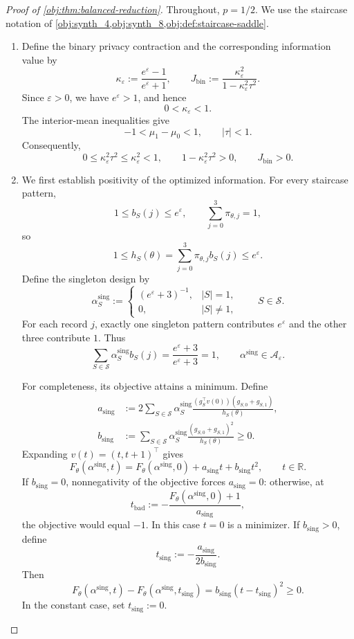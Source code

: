 \documentclass[11pt]{article}
\begin{document}
\begin{proof}[Proof of \cref{obj:thm:balanced-reduction}]
Throughout, \(p=1/2\). We use the staircase notation of \cref{obj:synth_4,obj:synth_8,obj:def:staircase-saddle}.

\begin{enumerate}
\item Define the binary privacy contraction and the corresponding information value by
\[
\kappa_\varepsilon
:=\frac{e^\varepsilon-1}{e^\varepsilon+1},
\qquad
J_{\mathrm{bin}}
:=\frac{\kappa_\varepsilon^2}
{1-\kappa_\varepsilon^2\tau^2}.
\]
Since \(\varepsilon>0\), we have \(e^\varepsilon>1\), and hence
\[
0<\kappa_\varepsilon<1.
\]
The interior-mean inequalities give
\[
-1<\mu_1-\mu_0<1,
\qquad |\tau|<1.
\]
Consequently,
\[
0\le \kappa_\varepsilon^2\tau^2
\le \kappa_\varepsilon^2<1,
\qquad
1-\kappa_\varepsilon^2\tau^2>0,
\qquad
J_{\mathrm{bin}}>0.
\]

\item We first establish positivity of the optimized information. For every staircase pattern,
\[
1\le b_S(j)\le e^\varepsilon,
\qquad
\sum_{j=0}^3\pi_{\theta,j}=1,
\]
so
\[
1\le h_S(\theta)
=\sum_{j=0}^3\pi_{\theta,j}b_S(j)
\le e^\varepsilon.
\]
Define the singleton design by
\[
\alpha^{\mathrm{sing}}_S
:=
\begin{cases}
(e^\varepsilon+3)^{-1},& |S|=1,\\
0,& |S|\ne1,
\end{cases}
\qquad S\in\mathcal S.
\]
For each record \(j\), exactly one singleton pattern contributes
\(e^\varepsilon\) and the other three contribute \(1\). Thus
\[
\sum_{S\in\mathcal S}
\alpha^{\mathrm{sing}}_S b_S(j)
=\frac{e^\varepsilon+3}{e^\varepsilon+3}=1,
\qquad
\alpha^{\mathrm{sing}}\in\mathcal A_\varepsilon.
\]

For completeness, its objective attains a minimum. Define
\[
\begin{aligned}
a_{\mathrm{sing}}
&:=2\sum_{S\in\mathcal S}
\alpha^{\mathrm{sing}}_S
\frac{(g_S^\top v(0))(g_{S,0}+g_{S,1})}
{h_S(\theta)},\\
b_{\mathrm{sing}}
&:=\sum_{S\in\mathcal S}
\alpha^{\mathrm{sing}}_S
\frac{(g_{S,0}+g_{S,1})^2}{h_S(\theta)}
\ge0.
\end{aligned}
\]
Expanding \(v(t)=(t,t+1)^\top\) gives
\[
F_\theta(\alpha^{\mathrm{sing}},t)
=
F_\theta(\alpha^{\mathrm{sing}},0)
+a_{\mathrm{sing}}t+b_{\mathrm{sing}}t^2,
\qquad t\in\mathbb R.
\]
If \(b_{\mathrm{sing}}=0\), nonnegativity of the objective forces
\(a_{\mathrm{sing}}=0\): otherwise, at
\[
t_{\mathrm{bad}}
:=-\frac{F_\theta(\alpha^{\mathrm{sing}},0)+1}
{a_{\mathrm{sing}}},
\]
the objective would equal \(-1\). In this case \(t=0\) is a minimizer.
If \(b_{\mathrm{sing}}>0\), define
\[
t_{\mathrm{sing}}
:=-\frac{a_{\mathrm{sing}}}{2b_{\mathrm{sing}}}.
\]
Then
\[
F_\theta(\alpha^{\mathrm{sing}},t)
-F_\theta(\alpha^{\mathrm{sing}},t_{\mathrm{sing}})
=b_{\mathrm{sing}}(t-t_{\mathrm{sing}})^2\ge0.
\]
In the constant case, set \(t_{\mathrm{sing}}:=0\).


\end{enumerate}
\end{proof}
\end{document}
